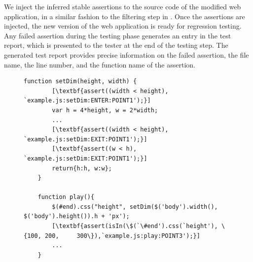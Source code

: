 We inject the inferred stable assertions to the \javascript source code of the modified web application, in a similar fashion to the filtering step in . Once the assertions are injected, the new version of the web application is ready for regression testing. Any failed assertion during the testing phase generates an entry in the test report, which is presented to the tester at the end of the testing step.
The generated test report provides precise information on the failed assertion, the file name,  the line number, and the function name of the assertion.

\begin{figure}[h]

\begin{mdframed}
\begin{lstlisting}[frame=none]
	function setDim(height, width) {
		[\textbf{assert((width < height), `example.js:setDim:ENTER:POINT1');}] 			
		var h = 4*height, w = 2*width;		
		...
		[\textbf{assert((width < height), `example.js:setDim:EXIT:POINT1');}]
		[\textbf{assert((w < h), `example.js:setDim:EXIT:POINT1');}]
		return{h:h, w:w};
	}

	function play(){
		$(#end).css("height", setDim($('body').width(), $('body').height()).h + 'px');
		[\textbf{assert(isIn(\$(`\#end').css(`height'), \{100, 200, 	300\}),`example.js:play:POINT3');}]
		...
	}
\end{lstlisting}
\end{mdframed}
\vspace{.2in}
\label{Fig:example_assertion}
\end{figure}


